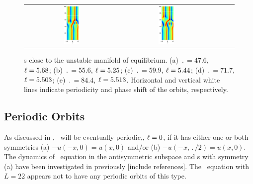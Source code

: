 \begin{figure}[t]
\begin{center}
\begin{tabular}{ccccc}
\includegraphics[width=0.18\textwidth]{figs/ks22rpo071.7-05.50.eps}\hspace{-3ex} &
\includegraphics[width=0.18\textwidth]{figs/ks22rpo084.4-05.51.eps}
\end{tabular}
\end{center}
\caption{\Rpo s close to the unstable manifold of  equilibrium.
(a) $\period{} = 47.6$, $\ell = 5.68$;
(b) $\period{} = 55.6$, $\ell = 5.25$;
(c) $\period{} = 59.9$, $\ell = 5.44$;
(d) $\period{} = 71.7$, $\ell = 5.503$;
(e) $\period{} = 84.4$, $\ell = 5.513$.
Horizontal and vertical white lines indicate periodicity and
phase shift of the orbits, respectively. }\label{f:ks22rposCage}
\end{figure}

\subsection{Periodic Orbits} \label{ssec:po}

As discussed in , \rpo\ will be eventually
periodic,\ie, $\ell = 0$, if it has either one or both symmetries
(a) $-u(-x,0) = u(x,0)$ and/or (b) $-u(-x,\period{}/2) =
u(x,0)$.
The dynamics of \KS\ equation in the antisymmetric subspace and
\po s with symmetry (a) have been investigated in previously
[include references]. The \KS\ equation with $L =
22$ appears not to have any periodic orbits of this type.

